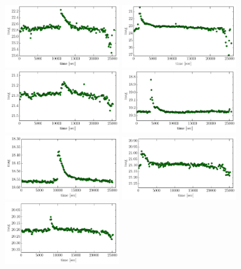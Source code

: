 \documentclass[iop, apj]{emulateapj}
\newcommand{\?}{\stackrel{?}{=}}
\begin{document}
\begin{figure}[h]
\includegraphics[width=5cm,clip,angle=90]{pic/flare/cand_7.pdf}
\includegraphics[width=5cm,clip,angle=90]{pic/flare/cand_8.pdf}
\includegraphics[width=5cm,clip,angle=90]{pic/flare/cand_9.pdf}
\includegraphics[width=5cm,clip,angle=90]{pic/flare/cand_10.pdf}
\includegraphics[width=5cm,clip,angle=90]{pic/flare/cand_11.pdf}
\includegraphics[width=5cm,clip,angle=90]{pic/flare/cand_12.pdf}
\includegraphics[width=5cm,clip,angle=90]{pic/flare/cand_13.pdf}

\end{figure}
\end{document}
